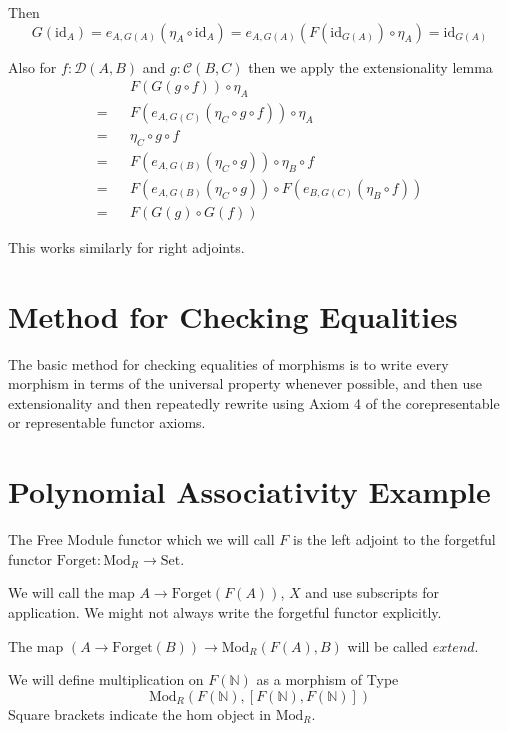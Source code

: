 \documentclass[12pt]{article} %
\theoremstyle{definition}
\theoremstyle{definition}
\theoremstyle{definition}
\theoremstyle{definition}
\begin{document}
Then 
\begin{equation}
  G(\text{id}_A) = e_{A,G(A)}(\eta_A \circ \text{id}_A) = 
e_{A,G(A)}(F (\text{id}_{G(A)}) \circ \eta_A) = \text{id}_{G(A)}
\end{equation}

Also for $f : \mathcal{D}(A, B)$ and $g : \mathcal{C}(B, C)$
then we apply the extensionality lemma
\begin{equation}
  \begin{aligned}
     && F(G(g \circ f)) \circ \eta_A \\
   = && F(e_{A, G(C)}(\eta_C \circ g \circ f)) \circ \eta_A \\
   = && \eta_C \circ g \circ f \\
   = && F(e_{A, G(B)}(\eta_C \circ g)) \circ \eta_B \circ f \\
   = && F(e_{A, G(B)}(\eta_C \circ g)) \circ F(e_{B, G(C)}(\eta_B \circ f)) \\
   = && F(G(g) \circ G(f))
  \end{aligned}
\end{equation}

This works similarly for right adjoints.

\section{Method for Checking Equalities}

The basic method for checking equalities of morphisms is to write every morphism in terms of 
the universal property whenever possible, and then use extensionality and then repeatedly 
rewrite using Axiom 4 of the corepresentable or representable functor axioms.

\section{Polynomial Associativity Example}

The Free Module functor which we will call $F$ is the left adjoint to the forgetful 
functor $\text{Forget} : \text{Mod}_R \to \text{Set}$.

We will call the map $A \to \text{Forget}(F(A))$, $X$ and use subscripts for application.
We might not always write the forgetful functor explicitly.

The map $(A \to \text{Forget}(B)) \to {\text{Mod}_R}(F(A), B)$ will be called $extend$.

We will define multiplication on $F(\mathbb{N})$ as a morphism of Type 
\begin{equation}
  \text{Mod}_R(F(\mathbb{N}), [F(\mathbb{N}), F(\mathbb{N})])
\end{equation} 
Square brackets indicate the hom object in $\text{Mod}_R$.
\end{document}
